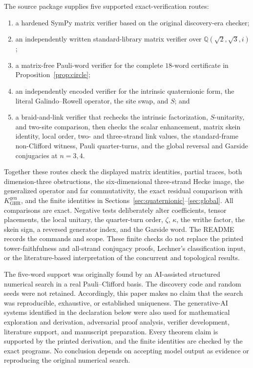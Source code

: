 \documentclass[11pt]{article}
\theoremstyle{remark}
\newcommand{\bbQ}{\mathbb Q}
\begin{document}
The source package supplies five supported exact-verification routes:
\begin{enumerate}[leftmargin=2.2em,itemsep=0.25em]
\item a hardened SymPy matrix verifier based on the original discovery-era
checker;
\item an independently written standard-library matrix verifier over
\(\bbQ(\sqrt2,\sqrt3,i)\);
\item a matrix-free Pauli-word verifier for the complete \(18\)-word
certificate in Proposition~\ref{prop:circle};
\item an independently encoded verifier for the intrinsic quaternionic form,
the literal Galindo--Rowell operator, the site swap, and \(S\); and
\item a braid-and-link verifier that rechecks the intrinsic factorization,
\(S\)-unitarity, and two-site comparison, then checks the scalar enhancement,
matrix skein identity, local order, two- and three-strand link values, the
standard-frame non-Clifford witness, Pauli quarter-turns, and the global
reversal and Garside conjugacies at \(n=3,4\).
\end{enumerate}
Together these routes check the displayed matrix identities, partial traces,
both dimension-three obstructions, the six-dimensional three-strand Hecke
image, the generalized operator and far commutativity, the exact residual
comparison with \(K_{\mathrm{GHR}}^{\mathrm{gen}}\), and the finite identities
in Sections~\ref{sec:quaternionic}--\ref{sec:global}.  All comparisons are
exact.  Negative tests deliberately alter coefficients, tensor placements,
the local unitary, the quarter-turn order, \(\zeta\), \(\kappa\), the writhe
factor, the skein sign, a reversed generator index, and the Garside word.  The
README records the commands and scope.  These finite checks do not replace the
printed tower-faithfulness and all-strand conjugacy proofs, Lechner's
classification input, or the literature-based interpretation of the
concurrent and topological results.

The five-word support was originally found by an AI-assisted structured
numerical search in a real Pauli--Clifford basis.  The discovery code and
random seeds were not retained.  Accordingly, this paper makes no claim that
the search was reproducible, exhaustive, or established uniqueness.  The
generative-AI systems identified in the declaration below were also used for
mathematical exploration and derivation, adversarial proof analysis, verifier
development, literature support, and manuscript preparation.  Every theorem
claim is supported by the printed derivation, and the finite identities are
checked by the exact programs.  No conclusion depends on accepting model
output as evidence or reproducing the original numerical search.
\end{document}

